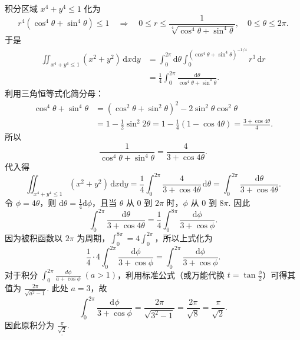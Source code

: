 \begin{enumerate}
积分区域 $x^4+y^4\le 1$ 化为
\[
r^4(\cos^4\theta+\sin^4\theta)\le 1 \quad\Longrightarrow\quad 0\le r\le \frac{1}{\sqrt[4]{\cos^4\theta+\sin^4\theta}},\quad 0\le\theta\le 2\pi.
\]
于是
\begin{align*}
\iint_{x^4+y^4\le 1}(x^2+y^2)\,\mathrm{d}x\mathrm{d}y
&= \int_0^{2\pi} \mathrm{d}\theta \int_0^{(\cos^4\theta+\sin^4\theta)^{-1/4}} r^3\,\mathrm{d}r \\
&= \frac{1}{4}\int_0^{2\pi} \frac{\mathrm{d}\theta}{\cos^4\theta+\sin^4\theta}.
\end{align*}
利用三角恒等式化简分母：
\begin{align*}
\cos^4\theta+\sin^4\theta
&= (\cos^2\theta+\sin^2\theta)^2 - 2\sin^2\theta\cos^2\theta \\
&= 1 - \frac{1}{2}\sin^2 2\theta
= 1 - \frac{1}{4}(1-\cos 4\theta)
= \frac{3+\cos 4\theta}{4}.
\end{align*}
所以
\[
\frac{1}{\cos^4\theta+\sin^4\theta} = \frac{4}{3+\cos 4\theta}.
\]
代入得
\[
\iint_{x^4+y^4\le 1}(x^2+y^2)\,\mathrm{d}x\mathrm{d}y = \frac{1}{4}\int_0^{2\pi} \frac{4}{3+\cos 4\theta}\,\mathrm{d}\theta = \int_0^{2\pi} \frac{\mathrm{d}\theta}{3+\cos 4\theta}.
\]
令 $\phi = 4\theta$，则 $\displaystyle\mathrm{d}\theta = \frac{1}{4}\mathrm{d}\phi$，且当 $\theta$ 从 $0$ 到 $2\pi$ 时，$\phi$ 从 $0$ 到 $8\pi$. 因此
\[
\int_0^{2\pi} \frac{\mathrm{d}\theta}{3+\cos 4\theta} = \frac{1}{4}\int_0^{8\pi} \frac{\mathrm{d}\phi}{3+\cos\phi}.
\]
因为被积函数以 $2\pi$ 为周期，$\displaystyle\int_0^{8\pi} = 4\int_0^{2\pi}$，所以上式化为
\[
\frac{1}{4}\cdot 4\int_0^{2\pi} \frac{\mathrm{d}\phi}{3+\cos\phi} = \int_0^{2\pi} \frac{\mathrm{d}\phi}{3+\cos\phi}.
\]
对于积分 $\displaystyle \int_0^{2\pi} \frac{d\phi}{a+\cos\phi}\;(a>1)$，利用标准公式（或万能代换 $\displaystyle t=\tan\frac{\phi}{2}$）可得其值为 $\displaystyle\frac{2\pi}{\sqrt{a^2-1}}$.
此处 $a=3$，故
\[
\int_0^{2\pi} \frac{\mathrm{d}\phi}{3+\cos\phi} = \frac{2\pi}{\sqrt{3^2-1}} = \frac{2\pi}{\sqrt{8}} = \frac{\pi}{\sqrt{2}}.
\]
因此原积分为 $\underline{\displaystyle \frac{\pi}{\sqrt{2}}}$.
\end{enumerate}

